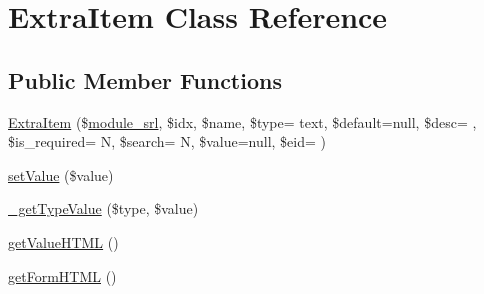 \hypertarget{classExtraItem}{}\section{Extra\+Item Class Reference}
\label{classExtraItem}
\subsection*{Public Member Functions}
\begin{DoxyCompactItemize}
\item 
\hyperlink{classExtraItem_abdf34ec801688507ddbc1acd513d2f8d}{Extra\+Item} (\$\hyperlink{ko_8install_8php_a370bb6450fab1da3e0ed9f484a38b761}{module\+\_\+srl}, \$idx, \$name, \$type= \textquotesingle{}text\textquotesingle{}, \$default=null, \$desc= \textquotesingle{}\textquotesingle{}, \$is\+\_\+required= \textquotesingle{}N\textquotesingle{}, \$search= \textquotesingle{}N\textquotesingle{}, \$value=null, \$eid= \textquotesingle{}\textquotesingle{})
\item 
\hyperlink{classExtraItem_a6bec289dc0622bd882a36cb9b5680b03}{set\+Value} (\$value)
\item 
\hyperlink{classExtraItem_ac285a098cdd05b2c152b3d94c8cb95db}{\+\_\+get\+Type\+Value} (\$type, \$value)
\item 
\hyperlink{classExtraItem_a7784f081919e81e4a41ab0c250d6ca52}{get\+Value\+H\+T\+M\+L} ()
\item 
\hyperlink{classExtraItem_aaedac8843abdf391e8f4d22704606898}{get\+Form\+H\+T\+M\+L} ()
\end{DoxyCompactItemize}
